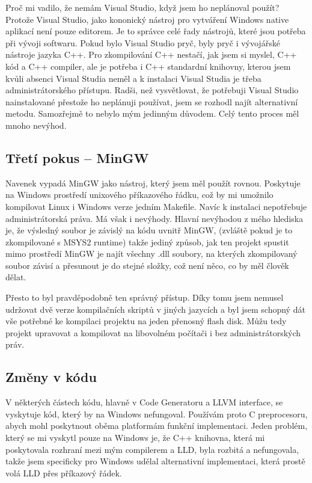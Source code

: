 \documentclass[12pt, a4paper, titlepage, abstract=on]{scrreprt}
\begin{document}
Proč mi vadilo, že nemám Visual Studio, když jsem ho neplánoval použít? Protože Visual Studio, jako kononický nástroj pro vytváření Windows
native aplikací není pouze editorem. Je to správce celé řady nástrojů, které jsou potřeba při vývoji softwaru. Pokud bylo Visual Studio pryč,
byly pryč i vývojářské nástroje jazyka C++. Pro zkompilování C++ nestačí, jak jsem si myslel, C++ kód a C++ compiler, ale je potřeba i
C++ standardní knihovny, kterou jsem kvůli absenci Visual Studia neměl a k instalaci Visual Studia je třeba administrátorského přístupu.
Radši, než vysvětlovat, že potřebuji Visual Studio nainstalované přestože ho neplánuji používat, jsem se rozhodl najít alternativní metodu.
Samozřejmě to nebylo mým jedinným důvodem. Celý tento proces měl mnoho nevýhod.

\subsection{Třetí pokus -- MinGW}
Navenek vypadá MinGW jako nástroj, který jsem měl použít rovnou. Poskytuje na Windows prostředí unixového příkazového řádku, což by mi
umožnilo kompilovat Linux i Windows verze jedním Makefile. Navíc k instalaci nepotřebuje administrátorská práva. Má však i nevýhody.
Hlavní nevýhodou z mého hlediska je, že výsledný soubor je závislý na kódu uvnitř MinGW, (zvláště pokud je to zkompilované s MSYS2 runtime)
takže jediný způsob, jak ten projekt spustit mimo prostředí MinGW je najít všechny .dll soubory, na kterých zkompilovaný soubor závisí a
přesunout je do stejné složky, což není něco, co by měl člověk dělat.

Přesto to byl pravděpodobně ten správný přístup. Díky tomu jsem nemusel udržovat dvě verze kompilačních skriptů v jiných jazycích
a byl jsem schopný dát vše potřebné ke kompilaci projektu na jeden přenosný flash disk. Můžu tedy projekt upravovat a kompilovat na
libovolném počítači i bez administrátorských práv.

\subsection{Změny v kódu}
V některých částech kódu, hlavně v Code Generatoru a LLVM interface, se vyskytuje kód, který by na Windows nefungoval. Používám proto
C preprocesoru, abych mohl poskytnout oběma platformám funkční implementaci. Jeden problém, který se mi vyskytl pouze na Windows je,
že C++ knihovna, která mi poskytovala rozhraní mezi mým compilerem a LLD, byla rozbitá a nefungovala, takže jsem specificky pro Windows
udělal alternativní implementaci, která prostě volá LLD přes příkazový řádek.
\end{document}
